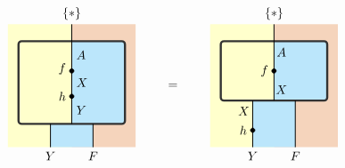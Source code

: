 \[
 \begin{tikzpicture}[x=0.6cm,y=0.6cm, baseline=(current bounding box.center), line width=0.7pt]
    \definecolor{leftcolor}{RGB}{255,255,204}
    \definecolor{rightcolor}{HTML}{BBE6FB}
    \definecolor{midcolor}{HTML}{F5D4BC}

    \node at (4.75, 1.1) {$=$};
  
    \begin{scope}[shift={(9.5,0)}]
     \fill[fill=leftcolor] (-3,-1.8) rectangle (0,4); 
     \fill[fill=midcolor] (0, -1.8) rectangle (3,4); 
     \fill[fill=rightcolor] (-1, -1.8) rectangle (1,2); 
        \begin{scope} 
            \clip (-2.5,0.4) rectangle (2.5,3.2);     
            \fill[fill=leftcolor] (-2.5,0) rectangle (0, 3.2);  
            \fill[fill=rightcolor] (0,0) rectangle (2.5, 3.2);  
        \end{scope}
        \draw[line width=1.7pt, color=black!80, rounded corners=2.5pt] (-2.5, 0.4) rectangle (2.5, 3.2); %
        \node[above,shift={(0.35,0.1)}] at (0, 0.4) {$X$};
        \node[left=1pt] at (0, 1.8) {$f$};
        \draw[fill=black] (0, 1.8) circle (0.1);  
        \draw (0, 4) -- (0, 0.4);
        \node[below,shift={(0.35,-0.1)}] at (0, 3.2) {$A$};
        \draw (1, 0.4) -- (1, -1.8);
        \draw (-1, 0.4) -- (-1, -1.8);
        \node[above] at (0, 4) {$\{*\}$};
        \node[below] at (-1, -1.8) {$Y$};
        \node[below] at (1, -1.8) {$F$};
        \node[left=-1pt] at (-1, -0.1) {$X$};
        \filldraw [black] (-1, -1) circle (0.1) node[left=1pt] {$h$};
    \end{scope}

    \begin{scope}
    \fill[fill=leftcolor] (-3,-1.8) rectangle (0,4); 
     \fill[fill=midcolor] (0, -1.8) rectangle (3,4); 
     \fill[fill=rightcolor] (-1, -1.8) rectangle (1,2); 
        \begin{scope} 
            \clip (-2.5,-0.7) rectangle (2.5,3.2);     
            \fill[fill=leftcolor] (-2.5,-2) rectangle (0, 3.2);  
            \fill[fill=rightcolor] (0,-2) rectangle (2.5, 3.2);  
        \end{scope}
        \draw[line width=1.7pt, color=black!80, rounded corners=2.5pt] (-2.5, -0.7) rectangle (2.5, 3.2); %
        \node[right] at (0, 1.25) {$X$};
        \node[left=1pt] at (0, 1.9) {$f$};
        \draw[fill=black] (0, 1.8) circle (0.1);  
        \draw (0, 4) -- (0, -0.7);
        \node[right] at (0, 2.55) {$A$};
        \draw (1, -0.7) -- (1, -1.8);
        \draw (-1, -0.7) -- (-1, -1.8);
        \node[above] at (0, 4) {$\{*\}$};
        \node[below] at (-1, -1.8) {$Y$};
        \node[below] at (1, -1.8) {$F$};
        \node[right] at (0, -0.05) {$Y$};
        \filldraw [black] (0, 0.6) circle (0.1) node[left=1pt] {$h$};
    \end{scope}
   
    \end{tikzpicture}
\]
